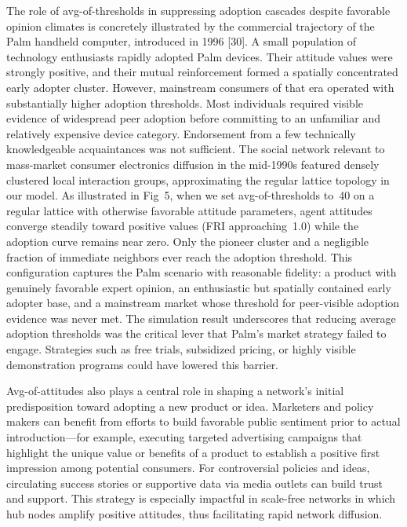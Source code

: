 \documentclass[10pt,letterpaper]{article}
\begin{document}
The role of avg-of-thresholds in suppressing adoption cascades despite favorable opinion climates is concretely illustrated by the commercial trajectory of the Palm handheld computer, introduced in 1996 [30]. A small population of technology enthusiasts rapidly adopted Palm devices. Their attitude values were strongly positive, and their mutual reinforcement formed a spatially concentrated early adopter cluster. However, mainstream consumers of that era operated with substantially higher adoption thresholds. Most individuals required visible evidence of widespread peer adoption before committing to an unfamiliar and relatively expensive device category. Endorsement from a few technically knowledgeable acquaintances was not sufficient. The social network relevant to mass-market consumer electronics diffusion in the mid-1990s featured densely clustered local interaction groups, approximating the regular lattice topology in our model. As illustrated in Fig~5, when we set avg-of-thresholds to~40 on a regular lattice with otherwise favorable attitude parameters, agent attitudes converge steadily toward positive values (FRI approaching~1.0) while the adoption curve remains near zero. Only the pioneer cluster and a negligible fraction of immediate neighbors ever reach the adoption threshold. This configuration captures the Palm scenario with reasonable fidelity: a product with genuinely favorable expert opinion, an enthusiastic but spatially contained early adopter base, and a mainstream market whose threshold for peer-visible adoption evidence was never met. The simulation result underscores that reducing average adoption thresholds was the critical lever that Palm's market strategy failed to engage. Strategies such as free trials, subsidized pricing, or highly visible demonstration programs could have lowered this barrier.

Avg-of-attitudes also plays a central role in shaping a network's initial predisposition toward adopting a new product or idea. Marketers and policy makers can benefit from efforts to build favorable public sentiment prior to actual introduction---for example, executing targeted advertising campaigns that highlight the unique value or benefits of a product to establish a positive first impression among potential consumers. For controversial policies and ideas, circulating success stories or supportive data via media outlets can build trust and support. This strategy is especially impactful in scale-free networks in which hub nodes amplify positive attitudes, thus facilitating rapid network diffusion.
\end{document}
